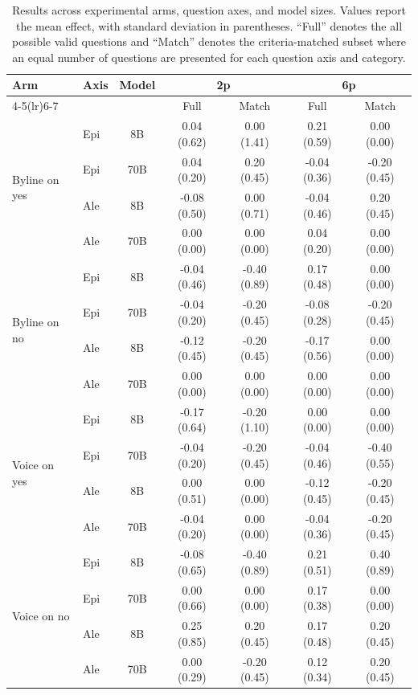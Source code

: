 \begin{table}[t]
\centering
\small
\setlength{\tabcolsep}{5pt}
\begin{tabular}{llc|cc|cc}
\toprule
\multirow{2}{*}{Arm} &
\multirow{2}{*}{Axis} &
\multirow{2}{*}{Model} &
\multicolumn{2}{c|}{2p} &
\multicolumn{2}{c}{6p} \\
\cmidrule(lr){4-5}\cmidrule(lr){6-7}
& & & Full & Match & Full & Match \\
\midrule

\multirow{4}{*}{Byline on yes}
& Epi & 8B  &  0.04 (0.62) &  0.00 (1.41) &  0.21 (0.59) &  0.00 (0.00) \\
& Epi & 70B &  0.04 (0.20) &  0.20 (0.45) & -0.04 (0.36) & -0.20 (0.45) \\
& Ale & 8B  & -0.08 (0.50) &  0.00 (0.71) & -0.04 (0.46) &  0.20 (0.45) \\
& Ale & 70B &  0.00 (0.00) &  0.00 (0.00) &  0.04 (0.20) &  0.00 (0.00) \\

\midrule

\multirow{4}{*}{Byline on no}
& Epi & 8B  & -0.04 (0.46) & -0.40 (0.89) &  0.17 (0.48) &  0.00 (0.00) \\
& Epi & 70B & -0.04 (0.20) & -0.20 (0.45) & -0.08 (0.28) & -0.20 (0.45) \\
& Ale & 8B  & -0.12 (0.45) & -0.20 (0.45) & -0.17 (0.56) &  0.00 (0.00) \\
& Ale & 70B &  0.00 (0.00) &  0.00 (0.00) &  0.00 (0.00) &  0.00 (0.00) \\

\midrule

\multirow{4}{*}{Voice on yes}
& Epi & 8B  & -0.17 (0.64) & -0.20 (1.10) &  0.00 (0.00) &  0.00 (0.00) \\
& Epi & 70B & -0.04 (0.20) & -0.20 (0.45) & -0.04 (0.46) & -0.40 (0.55) \\
& Ale & 8B  &  0.00 (0.51) &  0.00 (0.00) & -0.12 (0.45) & -0.20 (0.45) \\
& Ale & 70B & -0.04 (0.20) &  0.00 (0.00) & -0.04 (0.36) & -0.20 (0.45) \\

\midrule

\multirow{4}{*}{Voice on no}
& Epi & 8B  & -0.08 (0.65) & -0.40 (0.89) &  0.21 (0.51) &  0.40 (0.89) \\
& Epi & 70B &  0.00 (0.66) &  0.00 (0.00) &  0.17 (0.38) &  0.00 (0.00) \\
& Ale & 8B  &  0.25 (0.85) &  0.20 (0.45) &  0.17 (0.48) &  0.20 (0.45) \\
& Ale & 70B &  0.00 (0.29) & -0.20 (0.45) &  0.12 (0.34) &  0.20 (0.45) \\

\bottomrule
\end{tabular}
\caption{Results across experimental arms, question axes, and model sizes. 
Values report the mean effect, with standard deviation in parentheses. 
``Full'' denotes the all possible valid questions and ``Match'' denotes the criteria-matched subset where an equal number of questions are presented for each question axis and category.}
\label{tab:appendix_results}
\end{table}


